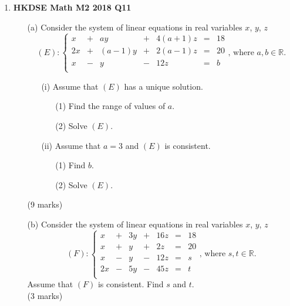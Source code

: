 \documentclass{report}
\begin{document}
\begin{enumerate}
	\item \textbf{HKDSE Math M2 2018 Q11}
	\begin{enumerate}
		\item [(a)]Consider the system of linear equations in real variables $x$, $y$, $z$
		$$(E) : \left\{\begin{matrix}
		x&  +&ay&  +&4(a+1)z& = &18  \\
		2x& +&(a-1)y&  +&2(a-1)z& = & 20 \\
		x&  -&y&  -&12z& = & b \\
		\end{matrix}\right.\text{, where }a,b \in \mathbb{R}. $$
		\begin{enumerate}
			\item [(i)]Assume that $(E)$ has a unique solution.
			\begin{enumerate}
				\item [(1)]Find the range of values of $a$. 
				\item [(2)]Solve $(E)$. 
			\end{enumerate}			
			\item [(ii)]Assume that $a = 3 $ and $(E)$ is consistent.
			\begin{enumerate}
				\item [(1)]Find $b$. 
				\item [(2)]Solve $(E)$.
			\end{enumerate}
		\end{enumerate}
		(9 marks)
		\item [(b)]Consider the system of linear equations in real variables $x$, $y$, $z$
		$$(F) : \left\{\begin{matrix}
		x&  +&	3y&	+&	16z&	=& 18  \\
		x& 	+&	y&	+&	2z&		=& 20 \\
		x&  -&	y&  -&	12z&	=& s \\
		2x& -&	5y& -&	45z&	=& t \\
		\end{matrix}\right.\text{, where }s,t \in \mathbb{R}.$$
		Assume that $(F)$ is consistent. Find $s$ and $t$. \\(3 marks)
	\end{enumerate}


\end{enumerate}
\end{document}
